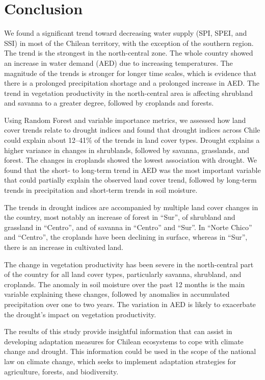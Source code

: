 \documentclass[
  authoryear,
  preprint,
  3p,
  onecolumn]{elsarticle}
\begin{document}
\hypertarget{conclusion}{%
\section{Conclusion}\label{conclusion}}

We found a significant trend toward decreasing water supply (SPI, SPEI,
and SSI) in most of the Chilean territory, with the exception of the
southern region. The trend is the strongest in the north-central zone.
The whole country showed an increase in water demand (AED) due to
increasing temperatures. The magnitude of the trends is stronger for
longer time scales, which is evidence that there is a prolonged
precipitation shortage and a prolonged increase in AED. The trend in
vegetation productivity in the north-central area is affecting shrubland
and savanna to a greater degree, followed by croplands and forests.

Using Random Forest and variable importance metrics, we assessed how
land cover trends relate to drought indices and found that drought
indices across Chile could explain about 12--41\% of the trends in land
cover types. Drought explains a higher variance in changes in
shrublands, followed by savanna, grasslands, and forest. The changes in
croplands showed the lowest association with drought. We found that the
short- to long-term trend in AED was the most important variable that
could partially explain the observed land cover trend, followed by
long-term trends in precipitation and short-term trends in soil
moisture.

The trends in drought indices are accompanied by multiple land cover
changes in the country, most notably an increase of forest in ``Sur'',
of shrubland and grassland in ``Centro'', and of savanna in ``Centro''
and ``Sur''. In ``Norte Chico'' and ``Centro'', the croplands have been
declining in surface, whereas in ``Sur'', there is an increase in
cultivated land.

The change in vegetation productivity has been severe in the
north-central part of the country for all land cover types, particularly
savanna, shrubland, and croplands. The anomaly in soil moisture over the
past 12 months is the main variable explaining these changes, followed
by anomalies in accumulated precipitation over one to two years. The
variation in AED is likely to exacerbate the drought's impact on
vegetation productivity.

The results of this study provide insightful information that can assist
in developing adaptation measures for Chilean ecosystems to cope with
climate change and drought. This information could be used in the scope
of the national law on climate change, which seeks to implement
adaptation strategies for agriculture, forests, and biodiversity.
\end{document}
